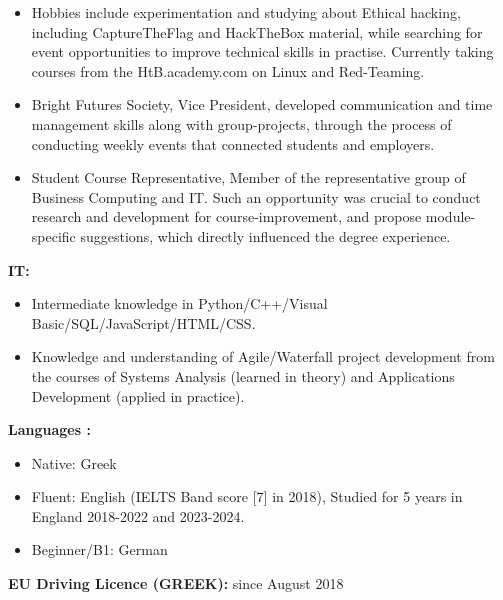 \begin{itemize}
    \item Hobbies include experimentation and studying about Ethical hacking, including CaptureTheFlag and HackTheBox material, while searching for event opportunities to improve technical skills in practise. Currently taking courses from the HtB.academy.com on Linux and Red-Teaming.
    \item Bright Futures Society, Vice President, developed communication and time management skills along with group-projects, through the process of conducting weekly events that connected students and employers.
    \item Student Course Representative, Member of the representative group of Business Computing and IT. Such an opportunity was crucial to conduct research and development for course-improvement, and propose module-specific suggestions, which directly influenced the degree experience.

\end{itemize}




\textbf{IT: }
\begin{itemize}
    \item Intermediate knowledge in Python/C++/Visual Basic/SQL/JavaScript/HTML/CSS.
    \item Knowledge and understanding of Agile/Waterfall project development from the courses of Systems Analysis (learned in theory) and Applications Development (applied in practice).
\end{itemize}

\textbf{Languages :}
\begin{itemize}
    \item Native: Greek
    \item Fluent: English (IELTS Band score [7] in 2018), Studied for 5 years in England 2018-2022 and 2023-2024.
    \item Beginner/B1: German
\end{itemize}

\textbf{EU Driving Licence (GREEK):} since August 2018